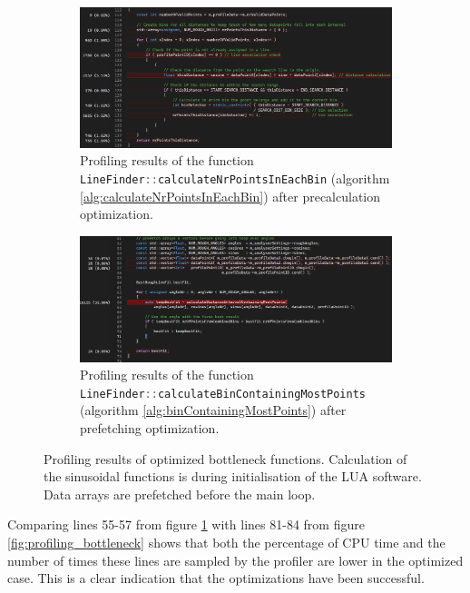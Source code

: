 \begin{figure}[H]
    \centering
    \begin{subfigure}{\textwidth}
        \centering
        \includegraphics[width=\textwidth]{images/profiling_bottleneck_optimized.png}
        \caption{Profiling results of the function \lstinline[language=c]|LineFinder::calculateNrPointsInEachBin| (algorithm \ref{alg:calculateNrPointsInEachBin}) after precalculation optimization.}
    \end{subfigure}
    \begin{subfigure}{\textwidth}
        \centering
        \includegraphics[width=\textwidth]{images/profiling_results_precalculation.png}
        \caption{Profiling results of the function \lstinline[language=c]|LineFinder::calculateBinContainingMostPoints| (algorithm \ref{alg:binContainingMostPoints}) after prefetching optimization.}\label{fig:profiling_results_precalculation}
    \end{subfigure}
    \caption{Profiling results of optimized bottleneck functions. Calculation of the sinusoidal functions is during initialisation of the LUA software. Data arrays are prefetched before the main loop.}
    \label{fig:profiling_bottleneck_optimized}
\end{figure}

Comparing lines 55-57 from figure \ref{fig:profiling_results_precalculation} with lines 81-84 from figure \ref{fig:profiling_bottleneck} shows that both the percentage of CPU time and the number of times these lines are sampled by the profiler are lower in the optimized case. This is a clear indication that the optimizations have been successful.

